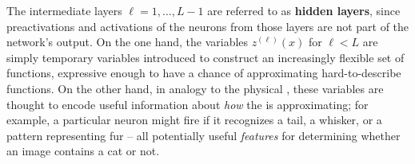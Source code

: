 The intermediate layers $\ell= 1, \dots, L-1$ are referred to as \textbf{hidden layers}, since preactivations and activations of the neurons from those layers are not part of the network's output. On the one hand, the variables $z^{(\ell)}(x)$ for $\ell < L$ are simply temporary variables introduced to construct
an increasingly flexible set of functions, expressive enough to have a chance of approximating hard-to-describe functions.
On the other hand, in analogy to the physical , these variables are thought to encode 
useful information about \emph{how} the  is approximating; for example, a particular neuron might fire if it recognizes a tail, a whisker, or a pattern representing fur -- all potentially useful \emph{features}
for determining whether an image contains a cat or not.










